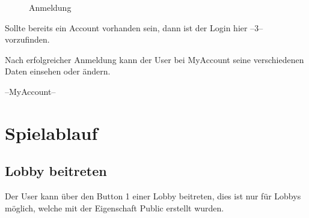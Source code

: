 \documentclass[11pt,ngerman]{article}
\begin{document}
    \begin{figure}[H]
    	\centering
    	\caption{Anmeldung}
    	\label{fig:Anmeldung}
    \end{figure}
    
    Sollte bereits ein Account vorhanden sein, dann ist der Login hier --3-- vorzufinden.
    
    
    Nach erfolgreicher Anmeldung kann der User bei MyAccount seine verschiedenen Daten einsehen oder ändern. 
    
    --MyAccount--
    
    \section{Spielablauf}
    
    
    \subsection{Lobby beitreten}
    
    Der User kann über den Button 1 einer Lobby beitreten, dies ist nur für Lobbys möglich, welche mit der Eigenschaft Public erstellt wurden.
    
    
\end{document}
